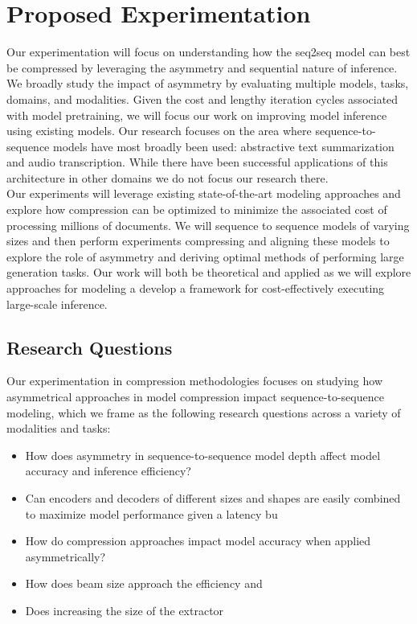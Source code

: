 \section{Proposed Experimentation}
Our experimentation will focus on understanding how the seq2seq model can best be compressed by leveraging the asymmetry and sequential nature of inference.  We broadly study the impact of asymmetry by evaluating multiple models, tasks, domains, and modalities. Given the cost and lengthy iteration cycles associated with model pretraining, we will focus our work on improving model inference using existing models. Our research focuses on the area where sequence-to-sequence models have most broadly been used: abstractive text summarization and audio transcription. While there have been successful applications of this architecture in other domains we do not focus our research there. \\
Our experiments will leverage existing state-of-the-art modeling approaches and explore how compression can be optimized to minimize the associated cost of processing millions of documents. We will sequence to sequence models of varying sizes and then perform experiments compressing and aligning these models to explore the role of asymmetry and deriving optimal methods of performing large generation tasks. Our work will both be theoretical and applied as we will explore approaches for modeling a develop a framework for cost-effectively executing large-scale inference. 
\subsection{Research Questions}
Our experimentation in compression methodologies focuses on studying how asymmetrical approaches in model compression impact sequence-to-sequence modeling, which we frame as the following research questions across a variety of modalities and tasks:
\begin{itemize}
\item How does asymmetry in sequence-to-sequence model depth affect model accuracy and inference efficiency?
\item Can encoders and decoders of different sizes and shapes are easily combined to maximize model performance given a latency bu
\item How do compression approaches impact model accuracy when applied asymmetrically?
\item How does beam size approach the efficiency and 
\item Does increasing the size of the extractor 
\end{itemize}
